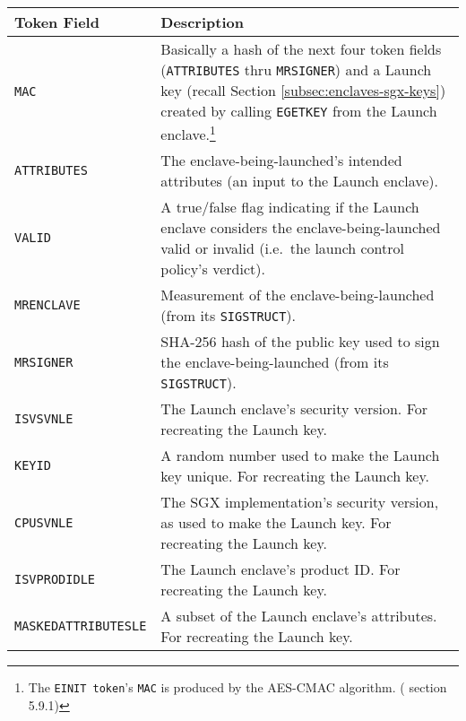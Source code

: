 \begin{tabularx}{\textwidth}{|l|X|}
\caption{{\tt EINIT token} Contents}
\label{table:einit-token-contents}\\
\hline
    Token Field & Description \\
\hline\hline
    {\tt MAC} & Basically a hash of the next four token fields ({\tt ATTRIBUTES} thru {\tt MRSIGNER}) and a Launch key (recall Section \ref{subsec:enclaves-sgx-keys}) created by calling {\tt EGETKEY} from the Launch enclave.\footnote{The {\tt EINIT token}'s {\tt MAC} is produced by the AES-CMAC algorithm. (\cite{intel-sgx-explained-advanced} section 5.9.1)} \\
\hline
    {\tt ATTRIBUTES} & The enclave-being-launched's intended attributes (an input to the Launch enclave). \\
\hline
    {\tt VALID} & A true/false flag indicating if the Launch enclave considers the enclave-being-launched valid or invalid (i.e.\ the launch control policy's verdict). \\
\hline
    {\tt MRENCLAVE} & Measurement of the enclave-being-launched (from its {\tt SIGSTRUCT}). \\
\hline
    {\tt MRSIGNER} & SHA-256 hash of the public key used to sign the enclave-being-launched (from its {\tt SIGSTRUCT}). \\
\hline
    {\tt ISVSVNLE} & The Launch enclave's security version. For recreating the Launch key.\\
\hline
    {\tt KEYID} & A random number used to make the Launch key unique. For recreating the Launch key. \\
\hline
    {\tt CPUSVNLE} & The SGX implementation's security version, as used to make the Launch key. For recreating the Launch key. \\
\hline
    {\tt ISVPRODIDLE} & The Launch enclave's product ID. For recreating the Launch key. \\
\hline
    {\tt MASKEDATTRIBUTESLE} & A subset of the Launch enclave's attributes. For recreating the Launch key. \\
\hline
\end{tabularx}

